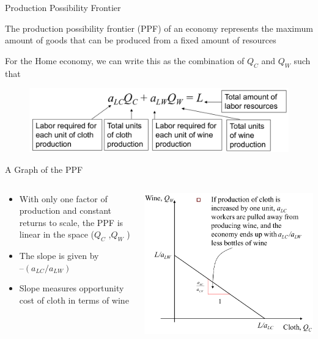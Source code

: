 \documentclass[10pt,hyperref={CJKbookmarks=true},xcolor=dvipsnames,aspectratio=169]{beamer}
\begin{document}
\begin{frame}{Production Possibility Frontier}


The production possibility frontier (PPF) of an economy represents
the maximum amount of goods that can be produced from a fixed amount
of resources 

For the Home economy, we can write this as the combination of $Q_{C}$
and $Q_{W}$ such that 

\begin{figure}


\centering{}\includegraphics[width=12cm]{fig/ricardo/lec3-04}
\end{figure}

\end{frame}

\begin{frame}{A Graph of the PPF}


\begin{columns}[onlytextwidth]
\begin{column}{0.4\textwidth}
\begin{itemize}
\item With only one factor of production and constant returns to scale,
the PPF is linear in the space ($Q_{C}$ ,$Q_{W}$ ) 
\item The slope is given by ${–}(a_{LC}/a_{LW})$ 
\item Slope measures opportunity cost of cloth in terms of wine
\end{itemize}

\end{column}
\begin{column}{0.6\textwidth}
\includegraphics[width=0.8\columnwidth]{fig/ricardo/lec3-05}
\end{column}
\end{columns}

\end{frame}
\end{document}
